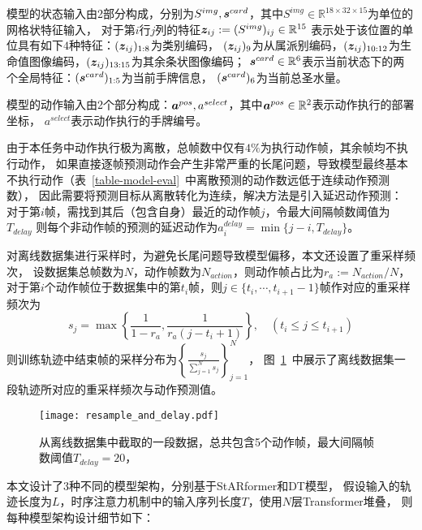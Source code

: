 \label{sec-model}
模型的状态输入由2部分构成，分别为$S^{img}, \boldsymbol{s}^{card}$，其中$S^{img}\in\mathbb{R}^{18\times 32\times 15}$为单位的网格状特征输入，
对于第$i$行$j$列的特征$\boldsymbol{z}_{ij}:=(S^{img})_{ij}\in\mathbb{R}^{15}$
表示处于该位置的单位具有如下$4$种特征：$(\boldsymbol{z}_{ij})_{1:8}$为类别编码，
$(\boldsymbol{z}_{ij})_9$为从属派别编码，$(\boldsymbol{z}_{ij})_{10:12}$为生命值图像编码，$(\boldsymbol{z}_{ij})_{13:15}$为其余条状图像编码；
$\boldsymbol{s}^{card}\in\mathbb{R}^6$表示当前状态下的两个全局特征：$(\boldsymbol{s}^{card})_{1:5}$为当前手牌信息，
$(\boldsymbol{s}^{card})_6$为当前总圣水量。

模型的动作输入由2个部分构成：$\boldsymbol{a}^{pos}, a^{select}$，其中$\boldsymbol{a}^{pos}\in\mathbb{R}^2$表示动作执行的部署坐标，
$a^{select}$表示动作执行的手牌编号。

\label{sec-target}
由于本任务中动作执行极为离散，总帧数中仅有$4\%$为执行动作帧，其余帧均不执行动作，
如果直接逐帧预测动作会产生非常严重的长尾问题，导致模型最终基本不执行动作（表~\ref{table-model-eval}~中离散预测的动作数远低于连续动作预测数），
因此需要将预测目标从离散转化为连续，解决方法是引入延迟动作预测：
对于第$i$帧，需找到其后（包含自身）最近的动作帧$j$，令最大间隔帧数阈值为$T_{delay}$
则每个非动作帧的预测的延迟动作为$a^{delay}_{i} = \min\{j-i, T_{delay}\}$。

对离线数据集进行采样时，为避免长尾问题导致模型偏移，本文还设置了重采样频次，
设数据集总帧数为$N$，动作帧数为$N_{action}$，则动作帧占比为$r_a:=N_{action} / N$，
对于第$i$个动作帧位于数据集中的第$t_i$帧，则$j\in\{t_{i},\cdots,t_{i+1}-1\}$帧作对应的重采样频次为
\begin{equation}\label{eq-resample-freq}
  s_j = \max\left\{\frac{1}{1-r_a}, \frac{1}{r_a(j-t_i+1)}\right\},\quad (t_i\leqslant j\leqslant t_{i+1})
\end{equation}
则训练轨迹中结束帧的采样分布为$\left\{\frac{s_j}{\sum_{j=1}^{N}s_j}\right\}_{j=1}^N$，
图~\ref{fig-resample-and-delay}~中展示了离线数据集一段轨迹所对应的重采样频次与动作预测值。
\begin{figure}[htbp]
  \centering
  \texttt{[image: resample\_and\_delay.pdf]}
  \caption{从离线数据集中截取的一段数据，总共包含5个动作帧，最大间隔帧数阈值$T_{delay} = 20$，}\label{fig-resample-and-delay}
\end{figure}

\label{sec-model-struct}
本文设计了3种不同的模型架构，分别基于StARformer和DT模型，
假设输入的轨迹长度为$L$，时序注意力机制中的输入序列长度$T$，使用$N$层Transformer堆叠，
则每种模型架构设计细节如下：


